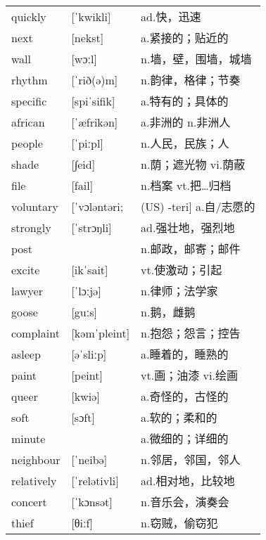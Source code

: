 \documentclass[a4paper]{article}
\begin{document}
\section{}
\begin{tabular}{l l l}

quickly & [ˈkwikli] & ad.快，迅速 \\
next & [nekst] & a.紧接的；贴近的 \\
wall & [wɔːl] & n.墙，壁，围墙，城墙 \\
rhythm & [ˈrið(ə)m] & n.韵律，格律；节奏 \\
specific & [spiˈsifik] & a.特有的；具体的 \\
african & [ˈæfrikən] & a.非洲的 n.非洲人 \\
people & [ˈpiːpl] & n.人民，民族；人 \\
shade & [∫eid] & n.荫；遮光物 vi.荫蔽 \\
file & [fail] & n.档案 vt.把…归档 \\
voluntary & [ˈvɔləntəri; & (US) -teri] a.自/志愿的 \\
strongly & [ˈstrɔŋli] & ad.强壮地，强烈地 \\
post &  & n.邮政，邮寄；邮件 \\
excite & [ikˈsait] & vt.使激动；引起 \\
lawyer & [ˈlɔːjə] & n.律师；法学家 \\
goose & [guːs] & n.鹅，雌鹅 \\
complaint & [kəmˈpleint] & n.抱怨；怨言；控告 \\
asleep & [əˈsliːp] & a.睡着的，睡熟的 \\
paint & [peint] & vt.画；油漆 vi.绘画 \\
queer & [kwiə] & a.奇怪的，古怪的 \\
soft & [sɔft] & a.软的；柔和的 \\
minute &  & a.微细的；详细的 \\
neighbour & [ˈneibə] & n.邻居，邻国，邻人 \\
relatively & [ˈrelətivli] & ad.相对地，比较地 \\
concert & [ˈkɔnsət] & n.音乐会，演奏会 \\
thief & [θiːf] & n.窃贼，偷窃犯 \\

\end{tabular}
\end{document}

